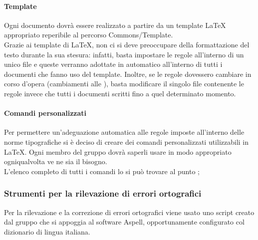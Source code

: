 			\paragraph{Template}
				Ogni documento dovrà essere realizzato a partire da un template \LaTeX{} appropriato reperibile al percorso Commons/Template.\\
				Grazie ai template di \LaTeX{}, non ci si deve preoccupare della formattazione del testo durante la sua stesura: infatti, basta impostare le regole all’interno di un unico file e queste verranno adottate in automatico all’interno di tutti i documenti che fanno uso del template. Inoltre, se le regole dovessero cambiare in corso d’opera (cambiamenti alle ), basta modificare il singolo file contenente le regole invece che tutti i documenti scritti fino a quel determinato momento.
			\paragraph{Comandi personalizzati}
				Per permettere un’adeguazione automatica alle regole imposte all’interno delle norme tipografiche si è deciso di creare dei comandi personalizzati utilizzabili in \LaTeX{}. Ogni membro del gruppo dovrà saperli usare in modo appropriato ogniqualvolta ve ne sia il bisogno.\\
				L’elenco completo di tutti i comandi lo si può trovare al punto ;
		\subsubsection{Strumenti per la rilevazione di errori ortografici}
			Per la rilevazione e la correzione di errori ortografici viene usato uno script creato dal gruppo \groupname{} che si appoggia al software Aspell, opportunamente configurato col dizionario di lingua italiana.
